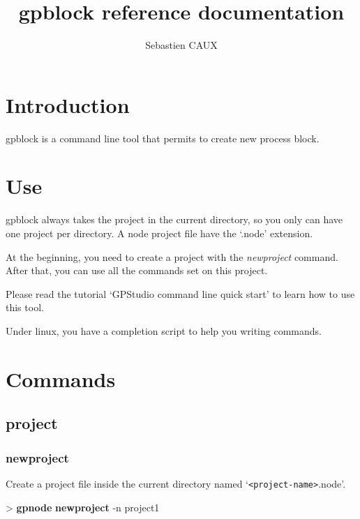 \documentclass[10pt,a4paper]{article}
\author{Sebastien CAUX}
\title{gpblock reference documentation \version}
\begin{document}
\maketitle
\section{Introduction}
gpblock is a command line tool that permits to create new process block.

\section{Use}
gpblock always takes the project in the current directory, so you only can have one project per directory. A node project file have the `.node' extension.

At the beginning, you need to create a project with the \emph{newproject} command. After that, you can use all the commands set on this project.

Please read the tutorial `GPStudio command line quick start' to learn how to use this tool.

Under linux, you have a completion script to help you writing commands.

\section{Commands}
\subsection{project}
\subsubsection{newproject}

Create a project file inside the current directory named `\texttt{<project-name>}.node'.


\begin{sampletitle}
> \textbf{gpnode} \textbf{newproject} -n project1
\end{sampletitle}

\end{document}
